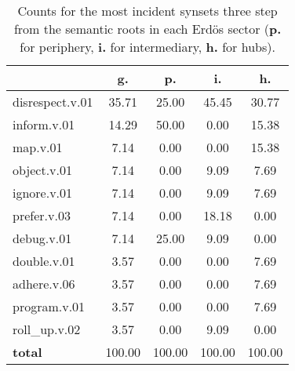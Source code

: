 \begin{table}[h!]
\begin{center}
\begin{tabular}{| l || c | c | c | c |}\hline
 & {\bf g.} & {\bf p.} & {\bf i.} & {\bf h.} \\\hline\hline
disrespect.v.01 & 35.71  & 25.00  & 45.45  & 30.77 \\\hline
inform.v.01 & 14.29  & 50.00  & 0.00  & 15.38 \\\hline
map.v.01 & 7.14  & 0.00  & 0.00  & 15.38 \\\hline
object.v.01 & 7.14  & 0.00  & 9.09  & 7.69 \\\hline
ignore.v.01 & 7.14  & 0.00  & 9.09  & 7.69 \\\hline
prefer.v.03 & 7.14  & 0.00  & 18.18  & 0.00 \\\hline
debug.v.01 & 7.14  & 25.00  & 9.09  & 0.00 \\\hline
double.v.01 & 3.57  & 0.00  & 0.00  & 7.69 \\\hline
adhere.v.06 & 3.57  & 0.00  & 0.00  & 7.69 \\\hline
program.v.01 & 3.57  & 0.00  & 0.00  & 7.69 \\\hline
roll\_up.v.02 & 3.57  & 0.00  & 9.09  & 0.00 \\\hline\hline
{{\bf total}} & 100.00  & 100.00  & 100.00  & 100.00 \\\hline
\end{tabular}
\caption{Counts for the most incident synsets three step from the semantic roots in each Erd\"os sector ({\bf p.} for periphery, {\bf i.} for intermediary, {\bf h.} for hubs).}
\end{center}
\end{table}

